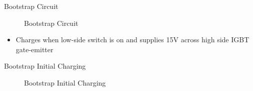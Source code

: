 \begin{frame}{Bootstrap Circuit}
	\begin{figure}
		\centering


		\caption{Bootstrap Circuit}
	\end{figure}

	\begin{itemize}
		\item Charges when low-side switch is on and supplies 15V across high side IGBT gate-emitter
	\end{itemize}
\end{frame}



\begin{frame}{Bootstrap Initial Charging}
	\begin{figure}
		\centering


		\caption{Bootstrap Initial Charging}
	\end{figure}
\end{frame}


